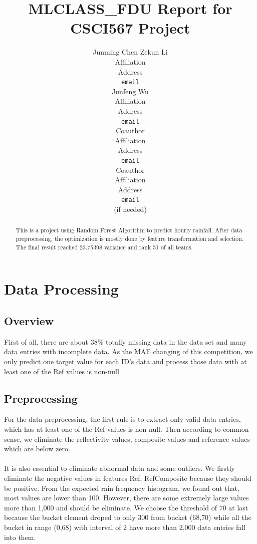 \documentclass{article} %
\title{MLCLASS\_FDU Report for CSCI567 Project}
\author{
Junming Chen
\And
Zekun Li \\
Affiliation \\
Address \\
\texttt{email} \\
\AND
Junfeng Wu \\
Affiliation \\
Address \\
\texttt{email} \\
\And
Coauthor \\
Affiliation \\
Address \\
\texttt{email} \\
\And
Coauthor \\
Affiliation \\
Address \\
\texttt{email} \\
(if needed)\\
}
\begin{document}
\maketitle

\begin{abstract}
This is a project using Random Forest Algorithm to predict hourly rainfall. After data preprocessing, the optimization is mostly done by feature transformation and selection. The final result reached 23.75398 variance and rank 51 of all teams.
\end{abstract}

\section{Data Processing}

\subsection{Overview}
First of all, there are about 38\% totally missing data in the data set and many data entries with incomplete data. As the MAE changing of this competition, we only predict one target value for each ID's data and process those data with at least one of the Ref values is non-null.

\subsection{Preprocessing}

For the data preprocessing, the first rule is to extract only valid data entries, which has at least one of the Ref values is non-null. Then according to common sense, we eliminate the reflectivity values, composite values and reference values which are below zero. \\
\\
It is also essential to eliminate abnormal data and some outliers. We firstly eliminate the negative values in features Ref, RefComposite because they should be positive. From the expected rain frequency histogram, we found out that, most values are lower than 100. However, there are some extremely large values more than 1,000 and should be eliminate. We choose the threshold of 70 at last because the bucket element droped to only 300 from bucket (68,70) while all the bucket in range (0,68) with interval of 2 have more than 2,000 data entries fall into them.\\
\end{document}
